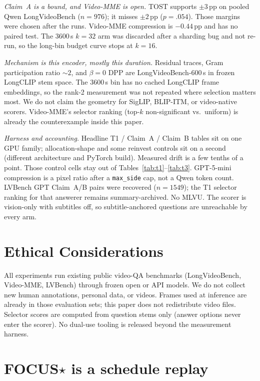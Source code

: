 \documentclass[11pt]{article}
\begin{document}
\emph{Claim~A is a bound, and Video-MME is open.}
TOST supports ${\pm}3$\,pp on pooled Qwen LongVideoBench ($n{=}976$); it misses ${\pm}2$\,pp ($p{=}.054$).
Those margins were chosen after the runs.
Video-MME compression is ${-}0.44$\,pp and has no paired test.
The 3600\,s $k{=}32$ arm was discarded after a sharding bug and not re-run, so the long-bin budget curve stops at $k{=}16$.

\emph{Mechanism is this encoder, mostly this duration.}
Residual traces, Gram participation ratio ${\sim}2$, and $\beta{=}0$ DPP are LongVideoBench-600\,s in frozen LongCLIP stem space.
The 3600\,s bin has no cached LongCLIP frame embeddings, so the rank-2 measurement was not repeated where selection matters most.
We do not claim the geometry for SigLIP, BLIP-ITM, or video-native scorers.
Video-MME's selector ranking (top-$k$ non-significant vs.\ uniform) is already the counterexample inside this paper.

\emph{Harness and accounting.}
Headline T1 / Claim~A / Claim~B tables sit on one GPU family; allocation-shape and some reinvest controls sit on a second (different architecture and PyTorch build).
Measured drift is a few tenths of a point.
Those control cells stay out of Tables~\ref{tab:t1}--\ref{tab:t3}.
GPT-5-mini compression is a pixel ratio after a \texttt{max\_side} cap, not a Qwen token count.
LVBench GPT Claim~A/B pairs were recovered ($n{=}1549$); the T1 selector ranking for that answerer remains summary-archived.
No MLVU.
The scorer is vision-only with subtitles off, so subtitle-anchored questions are unreachable by every arm.

\section{Ethical Considerations}
\label{sec:ethics}

All experiments run existing public video-QA benchmarks (LongVideoBench, Video-MME, LVBench) through frozen open or API models.
We do not collect new human annotations, personal data, or videos.
Frames used at inference are already in those evaluation sets; this paper does not redistribute video files.
Selector scores are computed from question stems only (answer options never enter the scorer).
No dual-use tooling is released beyond the measurement harness.



\appendix
\section{FOCUS$\star$ is a schedule replay}
\label{app:focus}
\end{document}
